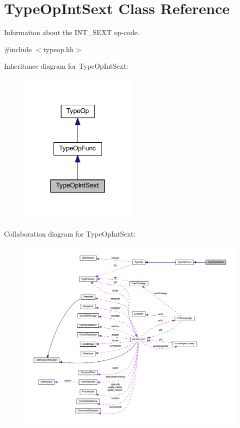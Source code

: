 \hypertarget{class_type_op_int_sext}{}\section{Type\+Op\+Int\+Sext Class Reference}
\label{class_type_op_int_sext}


Information about the I\+N\+T\+\_\+\+S\+E\+XT op-\/code.  




{\ttfamily \#include $<$typeop.\+hh$>$}



Inheritance diagram for Type\+Op\+Int\+Sext\+:
\nopagebreak
\begin{figure}[H]
\begin{center}
\leavevmode
\includegraphics[width=161pt]{class_type_op_int_sext__inherit__graph}
\end{center}
\end{figure}


Collaboration diagram for Type\+Op\+Int\+Sext\+:
\nopagebreak
\begin{figure}[H]
\begin{center}
\leavevmode
\includegraphics[width=350pt]{class_type_op_int_sext__coll__graph}
\end{center}
\end{figure}
